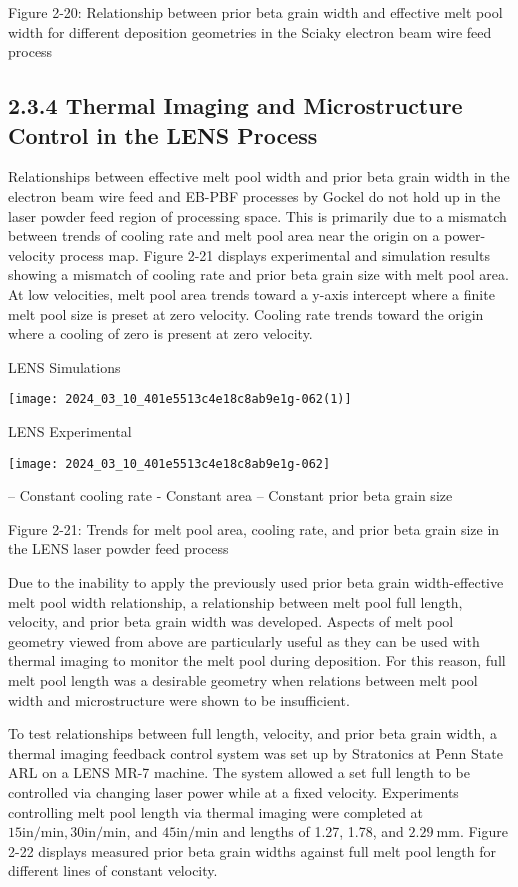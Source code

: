 \documentclass[10pt]{article}
\begin{document}
Figure 2-20: Relationship between prior beta grain width and effective melt pool width for different deposition geometries in the Sciaky electron beam wire feed process

\subsection*{2.3.4 Thermal Imaging and Microstructure Control in the LENS Process}
Relationships between effective melt pool width and prior beta grain width in the electron beam wire feed and EB-PBF processes by Gockel do not hold up in the laser powder feed region of processing space. This is primarily due to a mismatch between trends of cooling rate and melt pool area near the origin on a power-velocity process map. Figure 2-21 displays experimental and simulation results showing a mismatch of cooling rate and prior beta grain size with melt pool area. At low velocities, melt pool area trends toward a y-axis intercept where a finite melt pool size is preset at zero velocity. Cooling rate trends toward the origin where a cooling of zero is present at zero velocity.

LENS Simulations

\begin{center}
\texttt{[image: 2024\_03\_10\_401e5513c4e18c8ab9e1g-062(1)]}
\end{center}

LENS Experimental

\begin{center}
\texttt{[image: 2024\_03\_10\_401e5513c4e18c8ab9e1g-062]}
\end{center}

-- Constant cooling rate - Constant area -- Constant prior beta grain size

Figure 2-21: Trends for melt pool area, cooling rate, and prior beta grain size in the LENS laser powder feed process

Due to the inability to apply the previously used prior beta grain width-effective melt pool width relationship, a relationship between melt pool full length, velocity, and prior beta grain width was developed. Aspects of melt pool geometry viewed from above are particularly useful as they can be used with thermal imaging to monitor the melt pool during deposition. For this reason, full melt pool length was a desirable geometry when relations between melt pool width and microstructure were shown to be insufficient.

To test relationships between full length, velocity, and prior beta grain width, a thermal imaging feedback control system was set up by Stratonics at Penn State ARL on a LENS MR-7 machine. The system allowed a set full length to be controlled via changing laser power while at a fixed velocity. Experiments controlling melt pool length via thermal imaging were completed at $15 \mathrm{in} / \mathrm{min}, 30 \mathrm{in} / \mathrm{min}$, and $45 \mathrm{in} / \mathrm{min}$ and lengths of 1.27, 1.78, and $2.29 \mathrm{~mm}$. Figure 2-22 displays measured prior beta grain widths against full melt pool length for different lines of constant velocity.
\end{document}
